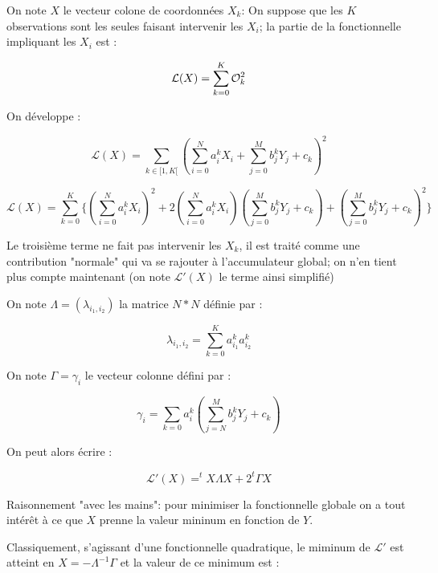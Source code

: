 On note $X$ le vecteur colone de coordonn\'ees $X_k$:
On suppose que les $K$ observations sont les seules faisant intervenir
les $X_i$; la partie de la fonctionnelle impliquant les $X_i$ est :

\begin{equation}
     \mathcal{L}(X) = \sum_{k=0}^K  \Ok ^2
\end{equation}

On d\'eveloppe :

\begin{equation}
     \mathcal{L}(X) = \sum_{k \in [1,K[}  
     ( \sum_{i=0}^N a^k_i X_i + \sum_{j=0}^M b^k_j Y_j + c_k )^2
\end{equation}

\begin{equation}
     \mathcal{L}(X) = \sum_{k=0}^K
     \{ ( \sum_{i=0}^N a^k_i X_i)^2  
    +  2(\sum_{i=0}^N a^k_i X_i)(\sum_{j=0}^M b^k_j Y_j + c_k)
    +  (\sum_{j=0}^M b^k_j Y_j + c_k )^2 \}
\end{equation}


Le troisi\`eme terme  ne fait pas intervenir les $X_k$, il est trait\'e
comme une contribution "normale" qui va se rajouter \`a l'accumulateur
global; on n'en tient plus compte maintenant (on note $\mathcal{L}'(X)$
le terme ainsi simplifi\'e)



On note $\Lambda =(\lambda_{i_1,i_2})$ la matrice $N*N$ d\'efinie par :

\begin{equation}
    \lambda_{i_1,i_2} = \sum_{k=0}^K a^k_{i_1} a^k_{i_2}
\end{equation}


On note $\Gamma =\gamma_{i}$ le vecteur colonne  d\'efini par :


\begin{equation}
    \gamma_{i} = \sum_{k=0} a^k_i (\sum_{j=N}^M b^k_j Y_j + c_k)
\end{equation}

On peut alors \'ecrire :

\begin{equation}
     \mathcal{L}'(X) =  ^t X \Lambda X + 2 ^t \Gamma  X
\end{equation}


Raisonnement "avec les mains": pour minimiser la fonctionnelle
globale on a tout int\'er\^et \`a ce que $X$ prenne la valeur
mininum en fonction de $Y$.

Classiquement, s'agissant d'une fonctionnelle quadratique,
le miminum de $\mathcal{L}'$ est atteint en $X= -\Lambda^{-1} \Gamma $ et
la valeur de ce minimum est  :

